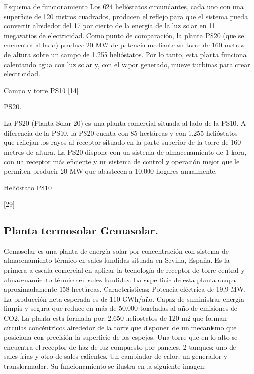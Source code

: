 \documentclass[12pt]{article}
\begin{document}
Esquema de funcionamiento
Los 624 helióstatos circundantes, cada uno con una superficie de 120 metros cuadrados, producen el reflejo para que el sistema pueda convertir alrededor del 17 por ciento de la energía de la luz solar en 11 megavatios de electricidad. Como punto de comparación, la planta PS20 (que se encuentra al lado) produce 20 MW de potencia mediante su torre de 160 metros de altura sobre un campo de 1.255 helióstatos.
Por lo tanto, esta planta funciona calentando agua con luz solar y, con el vapor generado, mueve turbinas para crear electricidad.

Campo y torre PS10
[14]



PS20.

La PS20 (Planta Solar 20) es una planta comercial situada al lado de la PS10.
A diferencia de la PS10, la PS20 cuenta con 85 hectáreas y con 1.255 helióstatos que reflejan los rayos al receptor situado en la parte superior de la torre de 160 metros de altura.
La PS20 dispone con un sistema de almacenamiento de 1 hora, con un receptor más eficiente y un sistema de control y operación mejor que le permiten producir 20 MW que abastecen a 10.000 hogares anualmente.

Helióstato PS10

[29]

\subsection{Planta termosolar Gemasolar.}

Gemasolar es una planta de energía solar por concentración con sistema de almacenamiento térmico en sales fundidas situada en Sevilla, España. Es la primera a escala comercial en aplicar la tecnología de receptor de torre central y almacenamiento térmico en sales fundidas. La superficie de esta planta ocupa aproximadamente 158 hectáreas. Características:
Potencia eléctrica de 19,9 MW.
La producción neta esperada es de 110 GWh/año.
Capaz de suministrar energía limpia y segura que reduce en más de 50.000 toneladas al año de emisiones de CO2.
La planta está formada por:
2.650 heliostatos de 120 m2 que forman círculos concéntricos alrededor de la torre que disponen de un mecanismo que posiciona con precisión la superficie de los espejos.
Una torre que en lo alto se encuentra el receptor de haz de luz compuesto por paneles.
2 tanques: uno de sales frías y otro de sales calientes.
Un cambiador de calor; un generador y transformador.
Su funcionamiento se ilustra en la siguiente imagen:
\end{document}
